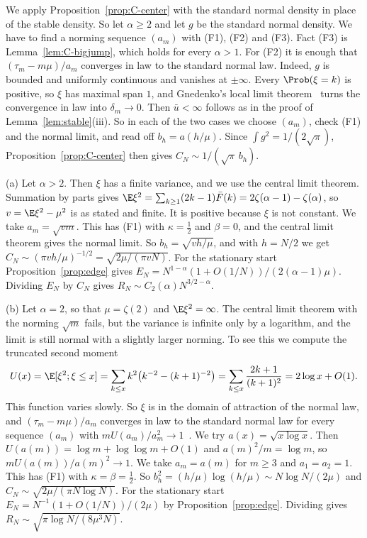 We apply Proposition~\ref{prop:C-center} with the standard normal density in place of the
stable density. So let $\alpha\ge2$ and let $g$ be the standard normal density. We have
to find a norming sequence $(a_m)$ with (F1), (F2) and (F3). Fact (F3) is
Lemma~\ref{lem:C-bigjump}, which holds for every $\alpha>1$. For (F2) it is enough that
$(\tau_m-m\mu)/a_m$ converges in law to the standard normal law. Indeed, $g$ is bounded
and uniformly continuous and vanishes at $\pm\infty$. Every $\Prob(\xi=k)$ is positive,
so $\xi$ has maximal span $1$, and Gnedenko's local limit
theorem~\cite[Theorem~4.2.1]{ibragimovlinnik1971} turns the convergence in law into
$\delta_m\to0$. Then $\bar u<\infty$ follows as in the proof of
Lemma~\ref{lem:stable}(iii). So in each of the two cases we choose $(a_m)$, check (F1)
and the normal limit, and read off $b_h=a(h/\mu)$. Since $\int g^2=1/(2\sqrt\pi)$,
Proposition~\ref{prop:C-center} then gives $C_N\sim1/(\sqrt\pi\,b_h)$.

(a) Let $\alpha>2$. Then $\xi$ has a finite variance, and we use the central limit
theorem. Summation by parts gives
$\E\xi^2=\sum_{k\ge1}(2k-1)\bar F(k)=2\zeta(\alpha-1)-\zeta(\alpha)$, so $v=\E\xi^2-\mu^2$
is as stated and finite. It is positive because $\xi$ is not constant. We take
$a_m=\sqrt{vm}$. This has (F1) with $\kappa=\frac12$ and $\beta=0$, and the central limit
theorem gives the normal limit. So $b_h=\sqrt{vh/\mu}$, and with $h=N/2$ we get
$C_N\sim(\pi vh/\mu)^{-1/2}=\sqrt{2\mu/(\pi vN)}$. For the stationary start
Proposition~\ref{prop:edge} gives $E_N=N^{1-\alpha}(1+O(1/N))/(2(\alpha-1)\mu)$.
Dividing $E_N$ by $C_N$ gives $R_N\sim C_2(\alpha)N^{3/2-\alpha}$.

(b) Let $\alpha=2$, so that $\mu=\zeta(2)$ and $\E\xi^2=\infty$. The central limit
theorem with the norming $\sqrt m$ fails, but the variance is infinite only by a
logarithm, and the limit is still normal with a slightly larger norming. To see this we
compute the truncated second moment
\[
U(x)=\E[\xi^2;\xi\le x]=\sum_{k\le x}k^2\bigl(k^{-2}-(k+1)^{-2}\bigr)
=\sum_{k\le x}\frac{2k+1}{(k+1)^2}=2\log x+O(1).
\]
This function varies slowly. So $\xi$ is in the domain of attraction of the normal law,
and $(\tau_m-m\mu)/a_m$ converges in law to the standard normal law for every sequence
$(a_m)$ with
$mU(a_m)/a_m^2\to1$~\cite[Theorem~XVII.5.3 and eq.~(XVII.5.23)]{feller1971}. We try
$a(x)=\sqrt{x\log x}$. Then $U(a(m))=\log m+\log\log m+O(1)$ and $a(m)^2/m=\log m$, so
$mU(a(m))/a(m)^2\to1$. We take $a_m=a(m)$ for $m\ge3$ and $a_1=a_2=1$. This has (F1)
with $\kappa=\beta=\frac12$. So $b_h^2=(h/\mu)\log(h/\mu)\sim N\log N/(2\mu)$ and
$C_N\sim\sqrt{2\mu/(\pi N\log N)}$. For the stationary start
$E_N=N^{-1}(1+O(1/N))/(2\mu)$ by Proposition~\ref{prop:edge}. Dividing gives
$R_N\sim\sqrt{\pi\log N/(8\mu^3N)}$.

